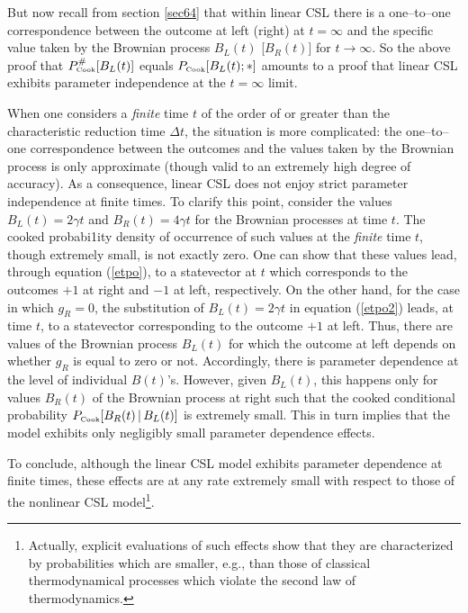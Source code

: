 \documentclass[12pt]{article}
\begin{document}
But now recall from section \ref{sec64} that within linear CSL
there is a one--to--one correspondence between the outcome at left
(right) at $t = \infty$ and the specific value taken by the
Brownian process $B_{L}(t)$ [$B_{R}(t)$] for $t \rightarrow
\infty$. So the above proof that $P^{\#}_{\makebox{\tiny
Cook}}[B_{L}(t)]$ equals $P_{\makebox{\tiny Cook}}[B_{L}(t);*]$
amounts to a proof that linear CSL exhibits parameter independence
at the $t = \infty$ limit.

When one considers a {\it finite} time $t$ of the order of or
greater than the characteristic reduction time $\Delta t$, the
situation is more complicated: the one--to--one correspondence
between the outcomes and the values taken by the Brownian process
is only approximate (though valid to an extremely high degree of
accuracy). As a consequence, linear CSL does not enjoy strict
parameter independence at finite times. To clarify this point,
consider the values $B_{L}(t) = 2\gamma t$ and $B_{R}(t) = 4\gamma
t$ for the Brownian processes at time $t$. The cooked probabi1ity
density of occurrence of such values at the {\it finite} time $t$,
though extremely small, is not exactly zero. One can show
\cite{ngbf} that these values lead, through equation (\ref{etpo}),
to a statevector at $t$ which corresponds to the outcomes $+1$ at
right and $-1$ at left, respectively. On the other hand, for the
case in which $g_{R} = 0$, the substitution of $B_{L}(t) = 2
\gamma t$ in equation (\ref{etpo2}) leads, at time $t$, to a
statevector corresponding to the outcome $+1$ at left. Thus, there
are values of the Brownian process $B_{L}(t)$ for which the
outcome at left depends on whether $g_{R}$ is equal to zero or
not. Accordingly, there is parameter dependence at the level of
individual $B(t)$'s. However, given $B_{L}(t)$, this happens only
for values $B_{R}(t)$ of the Brownian process at right such that
the cooked conditional probability $P_{\makebox{\tiny
Cook}}[B_{R}(t)\,|\,B_{L}(t)]$ is extremely small. This in turn
implies that the model exhibits only negligibly small parameter
dependence effects.

To conclude, although the linear CSL model exhibits parameter
dependence at finite times, these effects are at any rate
extremely small with respect to those of the nonlinear CSL
model\footnote{Actually, explicit evaluations of such effects show
that they are characterized by probabilities which are smaller,
e.g., than those of classical thermodynamical processes which
violate the second law of thermodynamics.}.
\end{document}
